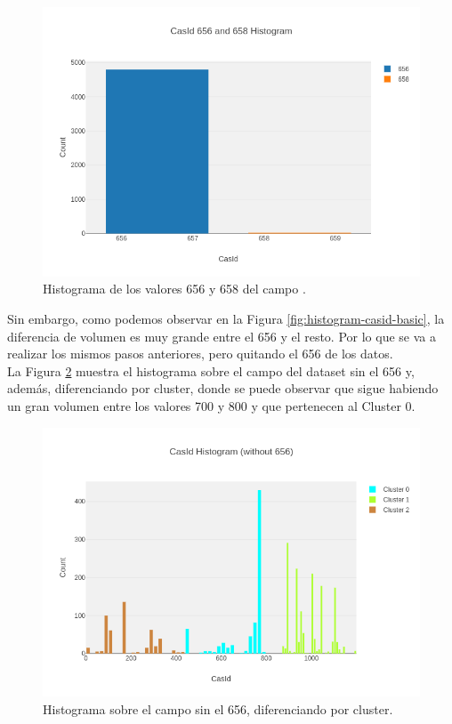 \begin{figure}[!th]
\includegraphics[scale=0.5]{figures/histogram-casid-656-658}
\centering
\caption{Histograma de los valores 656 y 658 del campo .}
\label{fig:histogram-casid-656-658}
\end{figure}


Sin embargo, como podemos observar en la Figura \ref{fig:histogram-casid-basic}, la diferencia de volumen es muy grande entre el  656 y el resto. Por lo que se va a realizar los mismos pasos anteriores, pero quitando el  656 de los datos. \\

La Figura \ref{fig:histogram-casid-without656} muestra el histograma sobre el campo  del dataset sin el  656 y, además, diferenciando por cluster, donde se puede observar que sigue habiendo un gran volumen entre los valores 700 y 800 y que pertenecen al Cluster 0.


\newpage
\begin{figure}[!th]
\includegraphics[scale=0.5]{figures/histogram-casid-without656}
\centering
\caption{Histograma sobre el campo  sin el  656, diferenciando por cluster.}
\label{fig:histogram-casid-without656}
\end{figure}

